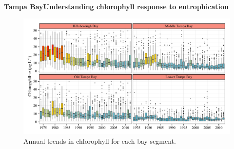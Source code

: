 \documentclass[serif]{beamer}\usepackage[]{graphicx}\usepackage[]{color}
\begin{document}
\begin{frame}{\textbf{Tampa Bay}}{\textbf{Understanding chlorophyll response to eutrophication}}
\begin{figure}[!ht]


{\centering \includegraphics[width=\linewidth]{fig/annual_chl} 

}

\caption[Annual trends in chlorophyll for each bay segment]{Annual trends in chlorophyll for each bay segment.\label{fig:annual_chl}}
\end{figure}


\end{frame}

\end{document}
